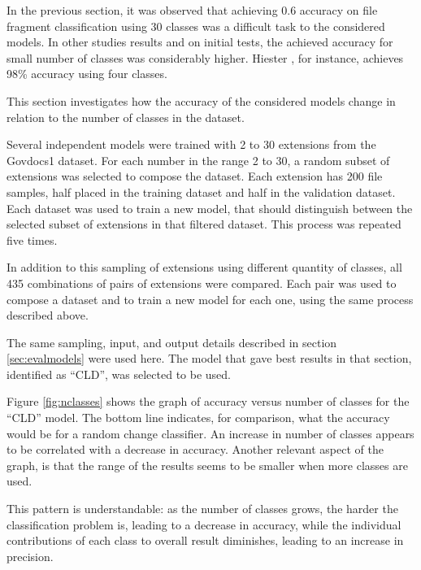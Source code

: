 \label{sec:numberofclasses}
In the previous section, it was observed that achieving 0.6 accuracy on file fragment classification using 30 classes was a difficult task to the considered models. In other studies results  and on initial tests, the achieved accuracy for small number of classes was considerably higher. Hiester \cite{hiester_file_2018}, for instance, achieves 98\% accuracy using four classes.

This section investigates how the accuracy of the considered models change in relation to the number of classes in the dataset.


Several independent models were trained with 2 to 30 extensions from the Govdocs1 dataset. For each number in the range 2 to 30, a random subset of extensions was selected to compose the dataset. Each extension has 200 file samples, half placed in the training dataset and half in the validation dataset. Each dataset was used to train a new model, that should distinguish between the selected subset of extensions in that filtered dataset. This process was repeated five times.



In addition to this sampling of extensions using different quantity of classes, all 435 combinations of pairs of extensions were compared. Each pair was used to compose a dataset and to train a new model for each one, using the same process described above.

The same sampling, input, and output details described in section \ref{sec:evalmodels} were used here. The model that gave best results in that section, identified as ``CLD'', was selected to be used.

Figure \ref{fig:nclasses} shows the graph of accuracy versus number of classes for the ``CLD'' model. The bottom line indicates, for comparison, what the accuracy would be for a random change classifier. An increase in number of classes appears to be  correlated with a decrease in accuracy. Another relevant aspect of the graph, is that the range of the results seems to be smaller when more classes are used.  

This pattern is understandable: as the number of classes grows, the harder the classification problem is, leading to a decrease in accuracy, while the individual contributions of each class to overall result diminishes, leading to an increase in precision.

